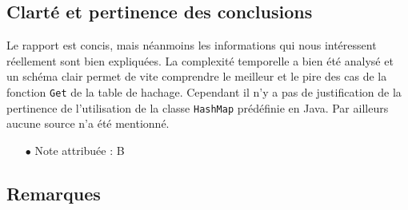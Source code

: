 \documentclass[11pt]{article}
\begin{document}
\subsection{Clarté et pertinence des conclusions}

Le rapport est concis, mais néanmoins les informations qui nous intéressent réellement sont bien expliquées. La complexité temporelle a bien été analysé et un schéma clair permet de vite comprendre le meilleur et le pire des cas de la fonction \verb+Get+ de la table de hachage. Cependant il n'y a pas de justification de la pertinence de l'utilisation de la classe \verb+HashMap+ prédéfinie en Java. Par ailleurs aucune source n'a été mentionné.
\\
\begin{itemize}
\item[$\bullet$] Note attribuée : B
\end{itemize}

  
\subsection{Remarques}
\end{document}
